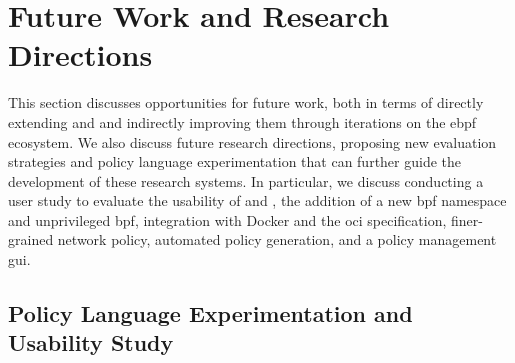 

\section{Future Work and Research Directions}%
\label{s:disc-future-work}

This section discusses opportunities for future work, both in terms of directly extending
\bpfbox{} and \bpfcontain{} and indirectly improving them through iterations on the
\gls{ebpf} ecosystem. We also discuss future research directions, proposing new evaluation
strategies and policy language experimentation that can further guide the development of
these research systems. In particular, we discuss conducting a user study to evaluate the
usability of \bpfbox{} and \bpfcontain{}, the addition of a new \gls{bpf} namespace and
unprivileged \gls{bpf}, integration with Docker and the \gls{oci} specification,
finer-grained network policy, automated policy generation, and a policy management \gls{gui}.


\subsection{Policy Language Experimentation and Usability Study}

